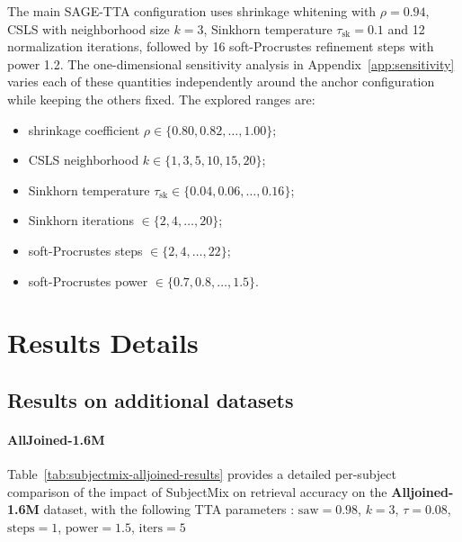 \documentclass{article}
\begin{document}
The main SAGE-TTA configuration uses shrinkage whitening with $\rho=0.94$, CSLS with neighborhood size $k=3$, Sinkhorn temperature $\tau_{\mathrm{sk}}=0.1$ and 12 normalization iterations, followed by 16 soft-Procrustes refinement steps with power 1.2. The one-dimensional sensitivity analysis in Appendix~\ref{app:sensitivity} varies each of these quantities independently around the anchor configuration while keeping the others fixed. The explored ranges are:
\begin{itemize}[leftmargin=1.5em]
    \item shrinkage coefficient $\rho \in \{0.80, 0.82, \dots, 1.00\}$;
    \item CSLS neighborhood $k \in \{1, 3, 5, 10, 15, 20\}$;
    \item Sinkhorn temperature $\tau_{\mathrm{sk}} \in \{0.04, 0.06, \dots, 0.16\}$;
    \item Sinkhorn iterations $\in \{2, 4, \dots, 20\}$;
    \item soft-Procrustes steps $\in \{2, 4, \dots, 22\}$;
    \item soft-Procrustes power $\in \{0.7, 0.8, \dots, 1.5\}$.
\end{itemize}

\section{Results Details}
\label{app:result-details}

\subsection{Results on additional datasets}
\label{alljoined-meg-results}

\paragraph{AllJoined-1.6M} Table~\ref{tab:subjectmix-alljoined-results} provides a detailed per-subject comparison of the impact of SubjectMix on retrieval accuracy on the \textbf{Alljoined-1.6M}\cite{xu2025alljoined} dataset, with the following TTA parameters : $\mathrm{saw}=0.98$, $k=3$, $\tau=0.08$, $\mathrm{steps}=1$, $\mathrm{power}=1.5$, $\mathrm{iters}=5$
\end{document}
